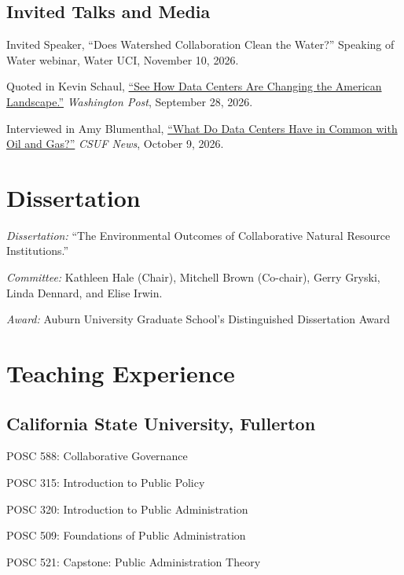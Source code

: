 \documentclass[11pt,letterpaper]{article}
\renewenvironment{itemize}{
  \begin{list}{}{
    \setlength{\leftmargin}{1.5em}
    \setlength{\itemsep}{0.25em}
    \setlength{\parskip}{0pt}
    \setlength{\parsep}{0.25em}
  }
}{
  \end{list}
}
\begin{document}
\subsection*{Invited Talks and Media}
\begin{itemize}\leftmargin=2pt\itemindent=-15pt
    \item Invited Speaker, ``Does Watershed Collaboration Clean the Water?'' Speaking of Water webinar, Water UCI, November 10, 2026.
    \item Quoted in Kevin Schaul, \href{https://www.washingtonpost.com/technology/interactive/2026/09/28/satellite-images-show-scale-americas-data-center-build-out/}{``See How Data Centers Are Changing the American Landscape.''} \emph{Washington Post}, September 28, 2026.
    \item Interviewed in Amy Blumenthal, \href{https://news.fullerton.edu/2026/10/what-do-data-centers-have-in-common-with-oil-and-gas/}{``What Do Data Centers Have in Common with Oil and Gas?''} \emph{CSUF News}, October 9, 2026.
\end{itemize}

\section*{Dissertation}
    \begin{itemize}\leftmargin=2pt\itemindent=-15pt\leftmargin=2pt\itemindent=-15pt
        \item \emph{Dissertation:} ``The Environmental Outcomes of Collaborative Natural Resource Institutions.'' 
        \item \emph{Committee:} Kathleen Hale (Chair), Mitchell Brown (Co-chair),
        Gerry Gryski, \\Linda Dennard, and Elise Irwin.
        \item \emph{Award:} Auburn University Graduate School's Distinguished Dissertation Award
    \end{itemize}
		
\section*{Teaching Experience}

\subsection*{California State University, Fullerton}
\begin{itemize}\leftmargin=2pt\itemindent=-15pt
  \item POSC 588: Collaborative Governance
  \item POSC 315: Introduction to Public Policy
  \item POSC 320: Introduction to Public Administration
  \item POSC 509: Foundations of Public Administration
  \item POSC 521: Capstone: Public Administration Theory
\end{itemize}
\end{document}
